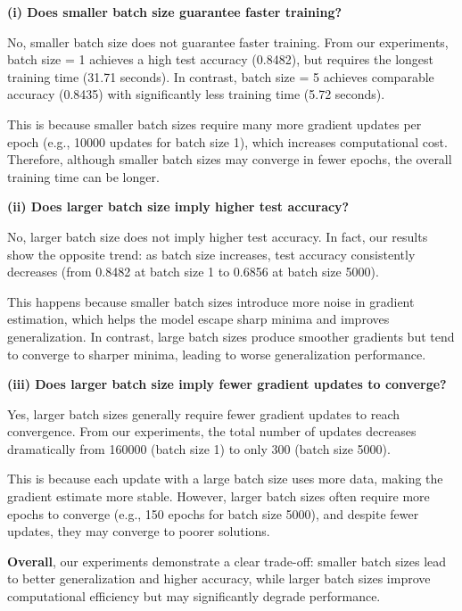 \textbf{(i) Does smaller batch size guarantee faster training?}

No, smaller batch size does not guarantee faster training. 
From our experiments, batch size = 1 achieves a high test accuracy (0.8482), but requires the longest training time (31.71 seconds). In contrast, batch size = 5 achieves comparable accuracy (0.8435) with significantly less training time (5.72 seconds). 

This is because smaller batch sizes require many more gradient updates per epoch (e.g., 10000 updates for batch size 1), which increases computational cost. Therefore, although smaller batch sizes may converge in fewer epochs, the overall training time can be longer.

\vspace{0.5em}
\textbf{(ii) Does larger batch size imply higher test accuracy?}

No, larger batch size does not imply higher test accuracy. 
In fact, our results show the opposite trend: as batch size increases, test accuracy consistently decreases (from 0.8482 at batch size 1 to 0.6856 at batch size 5000).

This happens because smaller batch sizes introduce more noise in gradient estimation, which helps the model escape sharp minima and improves generalization. In contrast, large batch sizes produce smoother gradients but tend to converge to sharper minima, leading to worse generalization performance.

\vspace{0.5em}
\textbf{(iii) Does larger batch size imply fewer gradient updates to converge?}

Yes, larger batch sizes generally require fewer gradient updates to reach convergence. 
From our experiments, the total number of updates decreases dramatically from 160000 (batch size 1) to only 300 (batch size 5000).

This is because each update with a large batch size uses more data, making the gradient estimate more stable. However, larger batch sizes often require more epochs to converge (e.g., 150 epochs for batch size 5000), and despite fewer updates, they may converge to poorer solutions.

\vspace{0.5em}
\textbf{Overall}, our experiments demonstrate a clear trade-off: smaller batch sizes lead to better generalization and higher accuracy, while larger batch sizes improve computational efficiency but may significantly degrade performance.

